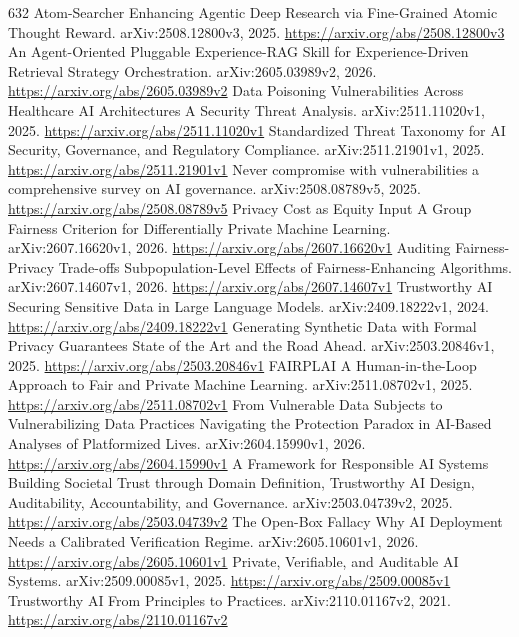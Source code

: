 \documentclass[11pt]{article}
\begin{document}
\begin{thebibliography}{632}
 Atom-Searcher Enhancing Agentic Deep Research via Fine-Grained Atomic Thought Reward. arXiv:2508.12800v3, 2025. \url{https://arxiv.org/abs/2508.12800v3}
 An Agent-Oriented Pluggable Experience-RAG Skill for Experience-Driven Retrieval Strategy Orchestration. arXiv:2605.03989v2, 2026. \url{https://arxiv.org/abs/2605.03989v2}
 Data Poisoning Vulnerabilities Across Healthcare AI Architectures A Security Threat Analysis. arXiv:2511.11020v1, 2025. \url{https://arxiv.org/abs/2511.11020v1}
 Standardized Threat Taxonomy for AI Security, Governance, and Regulatory Compliance. arXiv:2511.21901v1, 2025. \url{https://arxiv.org/abs/2511.21901v1}
 Never compromise with vulnerabilities a comprehensive survey on AI governance. arXiv:2508.08789v5, 2025. \url{https://arxiv.org/abs/2508.08789v5}
 Privacy Cost as Equity Input A Group Fairness Criterion for Differentially Private Machine Learning. arXiv:2607.16620v1, 2026. \url{https://arxiv.org/abs/2607.16620v1}
 Auditing Fairness-Privacy Trade-offs Subpopulation-Level Effects of Fairness-Enhancing Algorithms. arXiv:2607.14607v1, 2026. \url{https://arxiv.org/abs/2607.14607v1}
 Trustworthy AI Securing Sensitive Data in Large Language Models. arXiv:2409.18222v1, 2024. \url{https://arxiv.org/abs/2409.18222v1}
 Generating Synthetic Data with Formal Privacy Guarantees State of the Art and the Road Ahead. arXiv:2503.20846v1, 2025. \url{https://arxiv.org/abs/2503.20846v1}
 FAIRPLAI A Human-in-the-Loop Approach to Fair and Private Machine Learning. arXiv:2511.08702v1, 2025. \url{https://arxiv.org/abs/2511.08702v1}
 From Vulnerable Data Subjects to Vulnerabilizing Data Practices Navigating the Protection Paradox in AI-Based Analyses of Platformized Lives. arXiv:2604.15990v1, 2026. \url{https://arxiv.org/abs/2604.15990v1}
 A Framework for Responsible AI Systems Building Societal Trust through Domain Definition, Trustworthy AI Design, Auditability, Accountability, and Governance. arXiv:2503.04739v2, 2025. \url{https://arxiv.org/abs/2503.04739v2}
 The Open-Box Fallacy Why AI Deployment Needs a Calibrated Verification Regime. arXiv:2605.10601v1, 2026. \url{https://arxiv.org/abs/2605.10601v1}
 Private, Verifiable, and Auditable AI Systems. arXiv:2509.00085v1, 2025. \url{https://arxiv.org/abs/2509.00085v1}
 Trustworthy AI From Principles to Practices. arXiv:2110.01167v2, 2021. \url{https://arxiv.org/abs/2110.01167v2}

\end{thebibliography}
\end{document}
